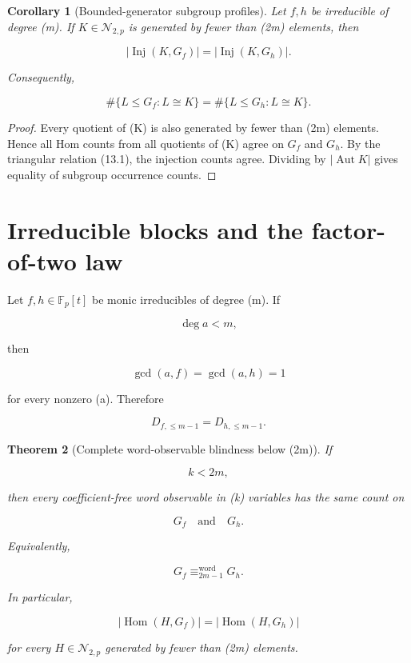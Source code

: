 \documentclass[11pt]{article}
\newtheorem{theorem}{Theorem}[section]
\newtheorem{corollary}[theorem]{Corollary}
\begin{document}
\begin{corollary}[Bounded-generator subgroup profiles]
Let $f,h$ be irreducible of degree (m). If $K\in\mathcal N_{2,p}$ is generated by fewer than (2m) elements, then

\[
|\operatorname{Inj}(K,G_f)|
=|\operatorname{Inj}(K,G_h)|.
\]

Consequently,

\[
\#\{L\le G_f:L\cong K\}
=\#\{L\le G_h:L\cong K\}.
\]

\end{corollary}

\begin{proof}
Every quotient of (K) is also generated by fewer than (2m) elements. Hence all Hom counts from all quotients of (K) agree on $G_f$ and $G_h$. By the triangular relation (13.1), the injection counts agree. Dividing by $|\operatorname{Aut}K|$ gives equality of subgroup occurrence counts.

\end{proof}

\section{Irreducible blocks and the factor-of-two law}

Let $f,h\in\mathbb F_p[t]$ be monic irreducibles of degree (m). If

\[
\deg a<m,
\]

then

\[
\gcd(a,f)=\gcd(a,h)=1
\]

for every nonzero (a). Therefore

\[
D_{{f},\le m-1}
=D_{{h},\le m-1}.
\]

\begin{theorem}[Complete word-observable blindness below (2m)]
If

\[
k<2m,
\]

then every coefficient-free word observable in (k) variables has the same count on

\[
G_f
\quad\text{and}\quad
G_h.
\]

Equivalently,

\[
G_f\equiv_{2m-1}^{\mathrm{word}}G_h.
\]

In particular,

\[
|\operatorname{Hom}(H,G_f)|
=|\operatorname{Hom}(H,G_h)|
\]

for every $H\in\mathcal N_{2,p}$ generated by fewer than (2m) elements.

\end{theorem}
\end{document}
